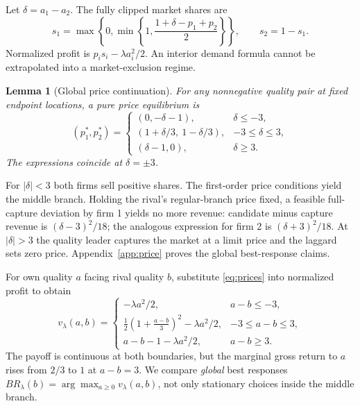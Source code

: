\documentclass[11pt]{article}
\newtheorem{lemma}{Lemma}
\begin{document}
Let $\delta=a_1-a_2$. The fully clipped market shares are
\begin{equation}\label{eq:demand}
s_1=\max\!\left\{0,\min\!\left\{1,\frac{1+\delta-p_1+p_2}{2}\right\}\right\},\qquad s_2=1-s_1.
\end{equation}
Normalized profit is $p_i s_i-\lambda a_i^2/2$. An interior demand formula cannot be extrapolated into a market-exclusion regime.

\begin{lemma}[Global price continuation]\label{lem:price}
For any nonnegative quality pair at fixed endpoint locations, a pure price equilibrium is
\begin{equation}\label{eq:prices}
(p_1^*,p_2^*)=\begin{cases}
(0,-\delta-1),&\delta\le-3,\\
(1+\delta/3,\ 1-\delta/3),&-3\le\delta\le3,\\
(\delta-1,0),&\delta\ge3.
\end{cases}
\end{equation}
The expressions coincide at $\delta=\pm3$.
\end{lemma}

For $|\delta|<3$ both firms sell positive shares. The first-order price conditions yield the middle branch. Holding the rival's regular-branch price fixed, a feasible full-capture deviation by firm 1 yields no more revenue: candidate minus capture revenue is $(\delta-3)^2/18$; the analogous expression for firm 2 is $(\delta+3)^2/18$. At $|\delta|>3$ the quality leader captures the market at a limit price and the laggard sets zero price. Appendix~\ref{app:price} proves the global best-response claims.

For own quality $a$ facing rival quality $b$, substitute \eqref{eq:prices} into normalized profit to obtain
\begin{equation}\label{eq:v}
v_\lambda(a,b)=\begin{cases}
-\lambda a^2/2,&a-b\le-3,\\[2pt]
\frac12\left(1+\frac{a-b}{3}\right)^2-\lambda a^2/2,&-3\le a-b\le3,\\[4pt]
a-b-1-\lambda a^2/2,&a-b\ge3.
\end{cases}
\end{equation}
The payoff is continuous at both boundaries, but the marginal gross return to $a$ rises from $2/3$ to $1$ at $a-b=3$. We compare \emph{global} best responses $BR_\lambda(b)=\arg\max_{a\ge0}v_\lambda(a,b)$, not only stationary choices inside the middle branch.
\end{document}
